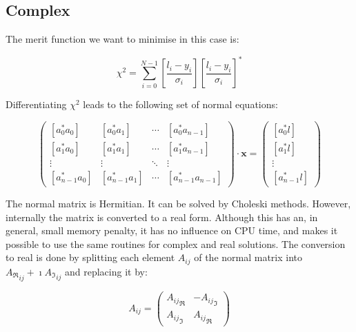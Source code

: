 \subsection{Complex}

The merit function we want to minimise in this case is:

\begin{equation}
	\chi^{2} = \sum_{i=0}^{N-1}
	{\left[ \frac{l_{i}-y_{i}}{\sigma_{i}} \right]}
	{\left[ \frac{l_{i}-y_{i}}{\sigma_{i}} \right]}^{*}
		\label{.e.chic}
\end{equation}

Differentiating $\chi^{2}$ leads to the following set of normal equations:

\begin{equation}
	\left( \begin{array}{cccc}
	\left[ a_{0}^{*}a_{0}\right] & \left[ a_{0}^{*}a_{1}\right] &
		 \cdots & \left[ a_{0}^{*}a_{n-1}\right] \\
	\left[ a_{1}^{*}a_{0}\right] & \left[ a_{1}^{*}a_{1}\right] &
		\cdots & \left[ a_{1}^{*}a_{n-1}\right] \\
	\vdots       & \vdots       & \ddots & \vdots \\
	\left[ a_{n-1}^{*}a_{0}\right] & \left[ a_{n-1}^{*}a_{1}\right] &
		\cdots & \left[ a_{n-1}^{*}a_{n-1}\right]
	       \end{array} \right)
	\cdot \mathbf{x} =
	\left( \begin{array} {c}
	\left[ a_{0}^{*}l\right] \\
	\left[ a_{1}^{*}l\right] \\
	\vdots \\
	\left[ a_{n-1}^{*}l\right]
	       \end{array} \right)
			\label{.e.solc}
\end{equation}

The normal matrix is Hermitian. It can be solved by Choleski methods.
However, internally the matrix is converted to a real form. Although this has
an, in general, small memory penalty, it has no influence on CPU time, and
makes it possible to use the same routines for complex and real solutions.
The conversion to real is done by splitting each element $A_{ij}$ of the
normal matrix into ${A_{\Re}}_{ij}+\imath{A_{\Im}}_{ij}$ and replacing it by:

\begin{equation}
	A_{ij}=\left( \begin{array}{rr}
		      {A_{ij}}_{\Re} & -{A_{ij}}_{\Im} \\
		      {A_{ij}}_{\Im} & {A_{ij}}_{\Re}
		      \end{array} \right)
\label{.e.comnor}
\end{equation}

